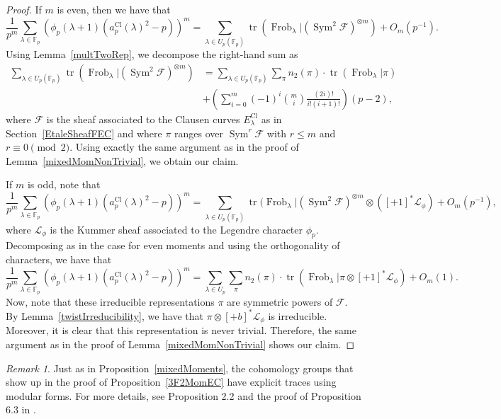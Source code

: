 \documentclass[12pt]{amsart}
\theoremstyle{definition}
\theoremstyle{remark}
\newtheorem{remark}[theorem]{Remark}
\numberwithin{equation}{section}
\def\F{{\mathbb F}}
\def\F{\mathbb{F}}
\DeclareMathOperator{\Frob}{Frob}
\DeclareMathOperator{\tr}{tr}
\DeclareMathOperator{\Sym}{Sym}
\DeclareMathOperator{\Cl}{Cl}
\begin{document}
\begin{proof}
    If $m$ is even, then we have that
    $$
    \frac{1}{p^m}\sum\limits_{\lambda\in\F_p}(\phi_p(\lambda+1)(a_p^{\Cl}(\lambda)^2-p))^m = \sum\limits_{\lambda\in U_p(\F_p)}\tr(\Frob_\lambda|(\Sym^2\mathcal{F})^{\otimes m}) + O_m(p^{-1}).
    $$
    Using Lemma~\ref{multTwoRep}, we decompose the right-hand sum as
    \begin{align*}
    \sum\limits_{\lambda\in U_p(\F_p)}\tr(\Frob_\lambda|(\Sym^2\mathcal{F})^{\otimes m}) &= \sum\limits_{\lambda\in U_p(\F_p)}\sum\limits_{\pi}n_2(\pi)\cdot\tr(\Frob_\lambda
    |\pi) \\ 
    &+\left(\sum\limits_{i=0}^m (-1)^i\binom{m}{i}\frac{(2i)!}{i!(i+1)!} \right)(p-2),
    \end{align*}
    where $\mathcal{F}$ is the sheaf associated to the Clausen curves $E_\lambda^{\Cl}$ as in Section~\ref{EtaleSheafFEC} and where $\pi$ ranges over $\Sym^r\mathcal{F}$ with $r\leq m$ and $r\equiv 0\pmod 2.$ Using exactly the same argument as in the proof of Lemma~\ref{mixedMomNonTrivial}, we obtain our claim.
    
    If $m$ is odd, note that
    $$
    \frac{1}{p^m}\sum\limits_{\lambda\in\F_p}(\phi_p(\lambda+1)(a_p^{\Cl}(\lambda)^2-p))^m = \sum\limits_{\lambda\in U_p(\F_p)}\tr(\Frob_\lambda|(\Sym^2\mathcal{F})^{\otimes m}\otimes ([+1]^\ast\mathcal{L}_\phi) + O_m(p^{-1}),
    $$
    where $\mathcal{L}_\phi$ is the Kummer sheaf associated to the Legendre character $\phi_p.$ Decomposing as in the case for even moments and using the orthogonality of characters, we have that
    $$
    \frac{1}{p^m}\sum\limits_{\lambda\in\F_p}(\phi_p(\lambda+1)(a_p^{\Cl}(\lambda)^2-p))^m = \sum\limits_{\lambda\in U_p}\sum\limits_{\pi}n_2(\pi)\cdot\tr(\Frob_\lambda|\pi\otimes[+1]^\ast\mathcal{L}_\phi) + O_m(1).
    $$
    Now, note that these irreducible representations $\pi$ are symmetric powers of $\mathcal{F}.$ By Lemma~\ref{twistIrreducibility}, we have that $\pi\otimes [+b]^\ast\mathcal{L}_\phi$ is irreducible. Moreover, it is clear that this representation is never trivial. Therefore, the same argument as in the proof of Lemma~\ref{mixedMomNonTrivial} shows our claim.
\end{proof}

\begin{remark}
    Just as in Proposition~\ref{mixedMoments}, the cohomology groups that show up in the proof of Proposition~\ref{3F2MomEC} have explicit traces using modular forms. For more details, see Proposition 2.2 and the proof of Proposition 6.3 in \cite{3F2Explicit}.
\end{remark}
\end{document}
